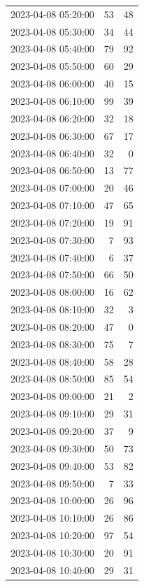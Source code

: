 \documentclass[
  letterpaper,
  DIV=11,
  numbers=noendperiod]{scrartcl}
\begin{document}
\begin{tabular}{lrr}
2023-04-08 05:20:00 &    53 &    48 \\
2023-04-08 05:30:00 &    34 &    44 \\
2023-04-08 05:40:00 &    79 &    92 \\
2023-04-08 05:50:00 &    60 &    29 \\
2023-04-08 06:00:00 &    40 &    15 \\
2023-04-08 06:10:00 &    99 &    39 \\
2023-04-08 06:20:00 &    32 &    18 \\
2023-04-08 06:30:00 &    67 &    17 \\
2023-04-08 06:40:00 &    32 &     0 \\
2023-04-08 06:50:00 &    13 &    77 \\
2023-04-08 07:00:00 &    20 &    46 \\
2023-04-08 07:10:00 &    47 &    65 \\
2023-04-08 07:20:00 &    19 &    91 \\
2023-04-08 07:30:00 &     7 &    93 \\
2023-04-08 07:40:00 &     6 &    37 \\
2023-04-08 07:50:00 &    66 &    50 \\
2023-04-08 08:00:00 &    16 &    62 \\
2023-04-08 08:10:00 &    32 &     3 \\
2023-04-08 08:20:00 &    47 &     0 \\
2023-04-08 08:30:00 &    75 &     7 \\
2023-04-08 08:40:00 &    58 &    28 \\
2023-04-08 08:50:00 &    85 &    54 \\
2023-04-08 09:00:00 &    21 &     2 \\
2023-04-08 09:10:00 &    29 &    31 \\
2023-04-08 09:20:00 &    37 &     9 \\
2023-04-08 09:30:00 &    50 &    73 \\
2023-04-08 09:40:00 &    53 &    82 \\
2023-04-08 09:50:00 &     7 &    33 \\
2023-04-08 10:00:00 &    26 &    96 \\
2023-04-08 10:10:00 &    26 &    86 \\
2023-04-08 10:20:00 &    97 &    54 \\
2023-04-08 10:30:00 &    20 &    91 \\
2023-04-08 10:40:00 &    29 &    31 \\

\end{tabular}
\end{document}
